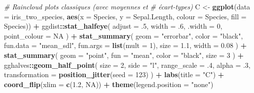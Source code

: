 \documentclass[
  french,
]{book}
\newenvironment{Shaded}{\begin{snugshade}}{\end{snugshade}}
\newcommand{\CommentTok}[1]{\textcolor[rgb]{0.56,0.35,0.01}{\textit{#1}}}
\newcommand{\DataTypeTok}[1]{\textcolor[rgb]{0.13,0.29,0.53}{#1}}
\newcommand{\DecValTok}[1]{\textcolor[rgb]{0.00,0.00,0.81}{#1}}
\newcommand{\FloatTok}[1]{\textcolor[rgb]{0.00,0.00,0.81}{#1}}
\newcommand{\KeywordTok}[1]{\textcolor[rgb]{0.13,0.29,0.53}{\textbf{#1}}}
\newcommand{\NormalTok}[1]{#1}
\newcommand{\OperatorTok}[1]{\textcolor[rgb]{0.81,0.36,0.00}{\textbf{#1}}}
\newcommand{\OtherTok}[1]{\textcolor[rgb]{0.56,0.35,0.01}{#1}}
\newcommand{\StringTok}[1]{\textcolor[rgb]{0.31,0.60,0.02}{#1}}
\begin{document}
\begin{Shaded}
\begin{Highlighting}[]
\CommentTok{# Raincloud plots classiques (avec moyennes et }
\CommentTok{# écart-types)}
\NormalTok{C <-}
\StringTok{  }\KeywordTok{ggplot}\NormalTok{(}\DataTypeTok{data =}\NormalTok{ iris_two_species, }
         \KeywordTok{aes}\NormalTok{(}\DataTypeTok{x =}\NormalTok{ Species, }\DataTypeTok{y =}\NormalTok{ Sepal.Length, }\DataTypeTok{colour =}\NormalTok{ Species, }\DataTypeTok{fill =}\NormalTok{ Species)) }\OperatorTok{+}
\StringTok{  }\NormalTok{ggdist}\OperatorTok{::}\KeywordTok{stat_halfeye}\NormalTok{(}
    \DataTypeTok{adjust =} \FloatTok{.5}\NormalTok{, }
    \DataTypeTok{width =} \FloatTok{.6}\NormalTok{, }
    \DataTypeTok{.width =} \DecValTok{0}\NormalTok{, }
    \DataTypeTok{point_colour =} \OtherTok{NA}
\NormalTok{    ) }\OperatorTok{+}
\StringTok{  }\KeywordTok{stat_summary}\NormalTok{(}
    \DataTypeTok{geom =} \StringTok{"errorbar"}\NormalTok{,}
    \DataTypeTok{color =} \StringTok{"black"}\NormalTok{,}
    \DataTypeTok{fun.data =} \StringTok{"mean_sdl"}\NormalTok{,}
    \DataTypeTok{fun.args =} \KeywordTok{list}\NormalTok{(}\DataTypeTok{mult =} \DecValTok{1}\NormalTok{),}
    \DataTypeTok{size =} \FloatTok{1.1}\NormalTok{, }
    \DataTypeTok{width =} \FloatTok{0.08}
\NormalTok{    ) }\OperatorTok{+}\StringTok{ }
\StringTok{  }\KeywordTok{stat_summary}\NormalTok{(}
    \DataTypeTok{geom =} \StringTok{"point"}\NormalTok{,}
    \DataTypeTok{fun =} \StringTok{"mean"}\NormalTok{, }
    \DataTypeTok{color =} \StringTok{"black"}\NormalTok{,}
    \DataTypeTok{size =} \DecValTok{3}
\NormalTok{    ) }\OperatorTok{+}
\StringTok{  }\NormalTok{gghalves}\OperatorTok{::}\KeywordTok{geom_half_point}\NormalTok{(}
    \DataTypeTok{size =} \DecValTok{2}\NormalTok{, }
    \DataTypeTok{side =} \StringTok{"l"}\NormalTok{, }
    \DataTypeTok{range_scale =} \FloatTok{.4}\NormalTok{, }
    \DataTypeTok{alpha =} \FloatTok{.3}\NormalTok{,}
    \DataTypeTok{transformation =} \KeywordTok{position_jitter}\NormalTok{(}\DataTypeTok{seed =} \DecValTok{123}\NormalTok{)}
\NormalTok{  ) }\OperatorTok{+}
\StringTok{  }\KeywordTok{labs}\NormalTok{(}\DataTypeTok{title =} \StringTok{"C"}\NormalTok{) }\OperatorTok{+}
\StringTok{  }\KeywordTok{coord_flip}\NormalTok{(}\DataTypeTok{xlim =} \KeywordTok{c}\NormalTok{(}\FloatTok{1.2}\NormalTok{, }\OtherTok{NA}\NormalTok{)) }\OperatorTok{+}
\StringTok{  }\KeywordTok{theme}\NormalTok{(}\DataTypeTok{legend.position =} \StringTok{"none"}\NormalTok{)}



\end{Highlighting}
\end{Shaded}
\end{document}
